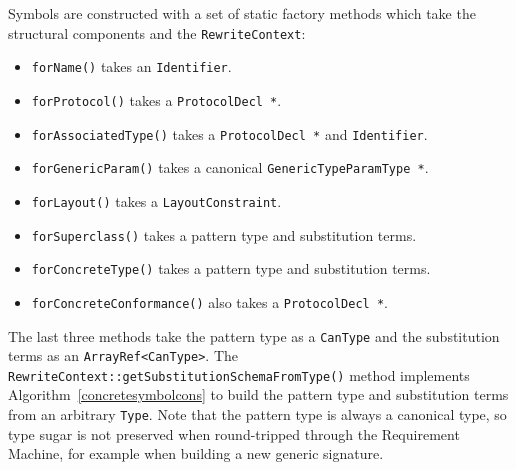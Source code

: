 \documentclass[../generics]{subfiles}
\begin{document}
Symbols are constructed with a set of static factory methods which take the structural components and the \texttt{RewriteContext}:
\begin{itemize}
\item \texttt{forName()} takes an \texttt{Identifier}.
\item \texttt{forProtocol()} takes a \texttt{ProtocolDecl *}.
\item \texttt{forAssociatedType()} takes a \texttt{ProtocolDecl *} and \texttt{Identifier}.
\item \texttt{forGenericParam()} takes a canonical \texttt{GenericTypeParamType *}.
\item \texttt{forLayout()} takes a \texttt{LayoutConstraint}.
\item \texttt{forSuperclass()} takes a pattern type and substitution terms.
\item \texttt{forConcreteType()} takes a pattern type and substitution terms.
\item \texttt{forConcreteConformance()} also takes a \texttt{ProtocolDecl *}.
\end{itemize}
The last three methods take the pattern type as a \texttt{CanType} and the substitution terms as an \texttt{ArrayRef<CanType>}. The \texttt{RewriteContext::getSubstitutionSchemaFromType()} method implements Algorithm~\ref{concretesymbolcons} to build the pattern type and substitution terms from an arbitrary \texttt{Type}. Note that the pattern type is always a canonical type, so type sugar is not preserved when round-tripped through the Requirement Machine, for example when building a new generic signature.
\end{document}
